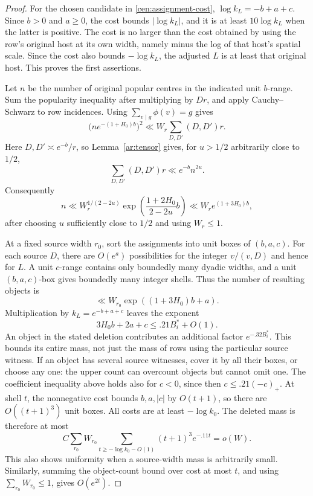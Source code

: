 \begin{proof}
For the chosen candidate in \eqref{cen:assignment-cost},
$\log k_L=-b+a+c$. Since $b>0$ and $a\ge0$, the cost bounds
$|\log k_L|$, and it is at least $10\log k_L$ when the latter is
positive. The cost is no larger than the cost obtained by using the
row's original host at its own width, namely minus the log of that
host's spatial scale. Since the cost also bounds $-\log k_L$, the
adjusted $L$ is at least that original host. This proves the first
assertions.

Let $n$ be the number of original popular centres in the indicated
unit $b$-range. Sum the popularity inequality after multiplying by
$Dr$, and apply Cauchy--Schwarz to row incidences. Using
$\sum_{v\mid g}\phi(v)=g$ gives
\[
 \bigl(n e^{-(1+H_0)b}\bigr)^2
 \ll W_r\sum_{D,D'}(D,D')r.
\]
Here $D,D'\asymp e^{-b}/r$, so Lemma~\ref{ar:tensor} gives, for $u>1/2$
arbitrarily close to $1/2$,
\[
 \sum_{D,D'}(D,D')r\ll e^{-b}n^{2u}.
\]
Consequently
\[
 n\ll W_r^{1/(2-2u)}
 \exp\left(\frac{1+2H_0}{2-2u}b\right)
 \ll W_r e^{(1+3H_0)b},
\]
after choosing $u$ sufficiently close to $1/2$ and using $W_r\le1$.

At a fixed source width $r_0$, sort the assignments into unit boxes
of $(b,a,c)$. For each source $D$, there are $O(e^a)$ possibilities
for the integer $v/(v,D)$ and hence for $L$. A unit $c$-range contains
only boundedly many dyadic widths, and a unit $(b,a,c)$-box gives
boundedly many integer shells. Thus the number of resulting objects
is
\[
 \ll W_{r_0}\exp((1+3H_0)b+a).
\]
Multiplication by $k_L=e^{-b+a+c}$ leaves the exponent
\[
 3H_0b+2a+c\le .21B_i^*+O(1).
\]
An object in the stated deletion contributes an additional factor
$e^{-.32B_i^*}$. This bounds its entire mass, not just the mass of
rows using the particular source witness. If an object has several
source witnesses, cover it by all their boxes, or choose any one:
the upper count can overcount objects but cannot omit one. The
coefficient inequality above holds also for $c<0$, since then
$c\le .21(-c)_+$. At shell $t$, the nonnegative cost bounds
$b,a,|c|$ by $O(t+1)$, so there are $O((t+1)^3)$ unit boxes.
All costs are at least $-\log k_0$. The deleted mass is therefore
at most
\[
 C\sum_{r_0}W_{r_0}
 \sum_{t\ge-\log k_0-O(1)}(t+1)^3e^{-.11t}=o(W).
\]
This also shows uniformity when a source-width mass is arbitrarily
small. Similarly, summing the object-count
bound over cost at most $t$, and using $\sum_{r_0}W_{r_0}\le1$,
gives $O(e^{2t})$.
\end{proof}

